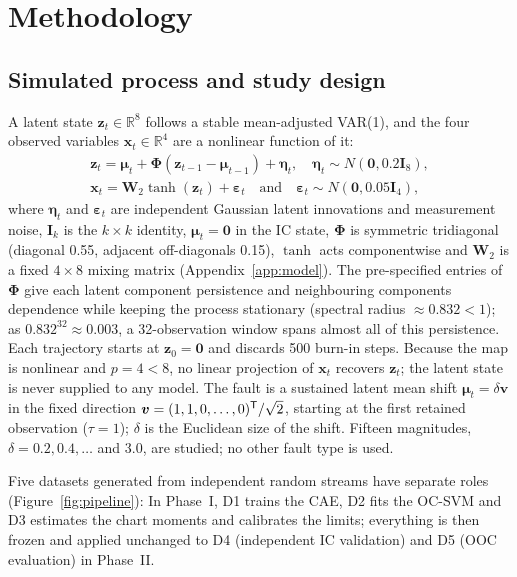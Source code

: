 \section{Methodology}

\subsection{Simulated process and study design}

A latent state $\bm{z}_t\in\mathbb{R}^8$ follows a stable mean-adjusted VAR(1), and the four observed variables $\bm{x}_t\in\mathbb{R}^4$ are a nonlinear function of it:
\begin{equation}
\begin{gathered}
\bm{z}_t=\bm{\mu}_t+\bm{\Phi}(\bm{z}_{t-1}-\bm{\mu}_{t-1})+\bm{\eta}_t,\quad
\bm{\eta}_t\sim N(\bm{0},0.2\bm{I}_8),\\
\bm{x}_t=\bm{W}_2\tanh(\bm{z}_t)+\bm{\varepsilon}_t\quad\text{and}\quad
\bm{\varepsilon}_t\sim N(\bm{0},0.05\bm{I}_4),
\end{gathered}
\label{eq:process}
\end{equation}
where $\bm{\eta}_t$ and $\bm{\varepsilon}_t$ are independent Gaussian latent innovations and measurement noise, $\bm{I}_k$ is the $k\times k$ identity, $\bm{\mu}_t=\bm{0}$ in the IC state, $\bm{\Phi}$ is symmetric tridiagonal (diagonal 0.55, adjacent off-diagonals 0.15), $\tanh$ acts componentwise and $\bm{W}_2$ is a fixed $4\times8$ mixing matrix (Appendix~\ref{app:model}). The pre-specified entries of $\bm{\Phi}$ give each latent component persistence and neighbouring components dependence while keeping the process stationary (spectral radius $\approx0.832<1$); as $0.832^{32}\approx0.003$, a 32-observation window spans almost all of this persistence. Each trajectory starts at $\bm{z}_0=\bm{0}$ and discards 500 burn-in steps.
Because the map is nonlinear and $p=4<8$, no linear projection of $\bm{x}_t$ recovers $\bm{z}_t$; the latent
state is never supplied to any model. The fault is a sustained latent mean shift
$\bm{\mu}_t=\delta\bm{v}$ in the fixed direction $\bm{v}=(1,1,0,\dots,0)^{\mathsf T}/\sqrt2$, starting at the first
retained observation ($\tau=1$); $\delta$ is the Euclidean size of the shift. Fifteen magnitudes,
$\delta=0.2,0.4,\dots$ and $3.0$, are studied; no other fault type is used.

Five datasets generated from independent random streams have separate roles
(Figure~\ref{fig:pipeline}): In Phase~I, D1 trains the CAE, D2 fits the OC-SVM and D3 estimates the chart moments and calibrates the limits; everything is then frozen and applied unchanged to D4 (independent IC validation) and D5 (OOC evaluation) in Phase~II.

